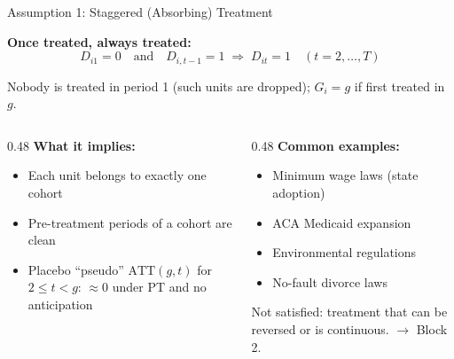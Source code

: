 \documentclass[main.tex]{subfiles}
\begin{document}
\begin{frame}{Assumption 1: Staggered (Absorbing) Treatment}

  \textbf{Once treated, always treated:}
  \[
    D_{i1} = 0 \quad\text{and}\quad D_{i,t-1} = 1 \;\Rightarrow\; D_{it} = 1
    \quad (t = 2,\dots,T)
  \]

  \medskip
  Nobody is treated in period 1 (such units are dropped); $G_i = g$ if
  first treated in $g$.

  \bigskip
  \begin{columns}[T]
    \begin{column}{0.48\textwidth}
      \textbf{What it implies:}
      \begin{itemize}
        \item Each unit belongs to exactly one cohort
        \item Pre-treatment periods of a cohort are clean
        \item Placebo ``pseudo'' $\text{ATT}(g,t)$ for $2 \le t < g$:
          $\approx 0$ under PT and no anticipation
      \end{itemize}
    \end{column}
    \begin{column}{0.48\textwidth}
      \textbf{Common examples:}
      \begin{itemize}
        \item Minimum wage laws (state adoption)
        \item ACA Medicaid expansion
        \item Environmental regulations
        \item No-fault divorce laws
      \end{itemize}

      \medskip
      \alert{Not satisfied:} treatment that can be reversed or
      is continuous. $\to$ Block 2.
    \end{column}
  \end{columns}

\end{frame}
\end{document}

